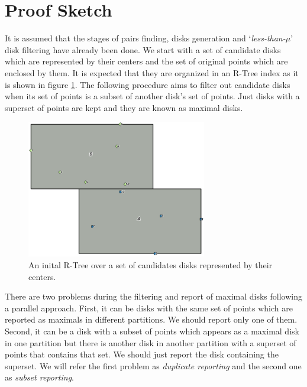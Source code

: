 \documentclass[12pt]{scrartcl}
\begin{document}
\renewcommand{\algorithmicrequire}{\textbf{Input:}}
\renewcommand{\algorithmicensure}{\textbf{Output:}}
\renewcommand{\algorithmicforall}{\textbf{for each}}

\section*{Proof Sketch}
It is assumed that the stages of pairs finding, disks generation and `\textit{less-than-$\mu$}' disk filtering have already been done. We start with a set of candidate disks which are represented by their centers and the set of original points which are enclosed by them.  It is expected that they are organized in an R-Tree index as it is shown in figure \ref{fig:r-tree}.  The following procedure aims to filter out candidate disks when its set of points is a subset of another disk's set of points.  Just disks with a superset of points are kept and they are known as maximal disks. 

\begin{figure}
  \centering
  \includegraphics[width=0.7\textwidth]{./Figures/r-tree}
  \caption{An inital R-Tree over a set of candidates disks represented by their centers.}
  \label{fig:r-tree}
\end{figure}

There are two problems during the filtering and report of maximal disks following a parallel approach. First, it can be disks with the same set of points which are reported as maximals in different partitions.  We should report only one of them.  Second, it can be a disk with a subset of points which appears as a maximal disk in one partition but there is another disk in another partition with a superset of points that contains that set.   We should just report the disk containing the superset.  We will refer the first problem as \textit{duplicate reporting} and the second one as \textit{subset reporting}.  
\end{document}
